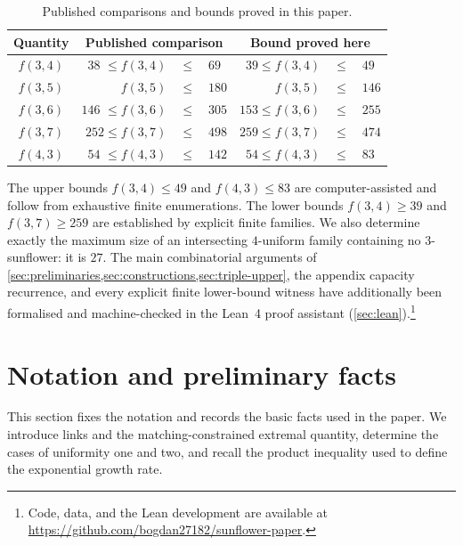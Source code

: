 \documentclass[11pt]{article}
\numberwithin{equation}{section}
\theoremstyle{definition}
\theoremstyle{remark}
\begin{document}
\begin{table}[H]
\centering
\caption{Published comparisons and bounds proved in this paper.}
\label{tab:intro-bounds}
\begin{tabular}{@{}c@{\quad}r@{\;}c@{\;}l@{\qquad}r@{\;}c@{\;}l@{}}
\toprule
Quantity & \multicolumn{3}{c}{Published comparison}
         & \multicolumn{3}{c}{Bound proved here}\\
\midrule
$f(3,4)$ & $38$ \cite{AbbottExoo1992} $\le f(3,4)$
         & $\le$ & $69$ \cite{AbbottHansonSauer1972}
         & $39\le f(3,4)$ & $\le$ & $49$\\
$f(3,5)$ & $f(3,5)$ & $\le$ & $180$ \cite{AbbottHansonSauer1972}
         & $f(3,5)$ & $\le$ & $146$\\
$f(3,6)$ & $146$ \cite{AbbottExoo1992} $\le f(3,6)$
         & $\le$ & $305$ \cite{AbbottHansonSauer1972}
         & $153\le f(3,6)$ & $\le$ & $255$\\
$f(3,7)$ & $252\le f(3,7)$ & $\le$ & $498$ \cite{FranklWang2025}
         & $259\le f(3,7)$ & $\le$ & $474$\\
$f(4,3)$ & $54$ \cite{AbbottHanson1974} $\le f(4,3)$
         & $\le$ & $142$ \cite{AbbottHansonSauer1972}
         & $54\le f(4,3)$ & $\le$ & $83$\\
\bottomrule
\end{tabular}
\end{table}

The upper bounds $f(3,4)\le49$ and $f(4,3)\le83$ are computer-assisted and
follow from exhaustive finite enumerations. The lower bounds
$f(3,4)\ge39$ and $f(3,7)\ge259$ are established by explicit finite families.
We also determine exactly the maximum size of an intersecting $4$-uniform
family containing no $3$-sunflower: it is $27$. The main
combinatorial arguments of
\cref{sec:preliminaries,sec:constructions,sec:triple-upper}, the appendix
capacity recurrence, and every explicit finite lower-bound witness have
additionally been formalised and machine-checked in the Lean~4 proof assistant
(\cref{sec:lean}).\footnote{Code, data, and the Lean development are available at
\url{https://github.com/bogdan27182/sunflower-paper}.}

\section{Notation and preliminary facts}
\label{sec:preliminaries}

This section fixes the notation and records the basic facts used in
the paper. We introduce links and the matching-constrained extremal quantity,
determine the cases of uniformity one and two, and recall the product
inequality used to define the exponential growth rate.
\end{document}
